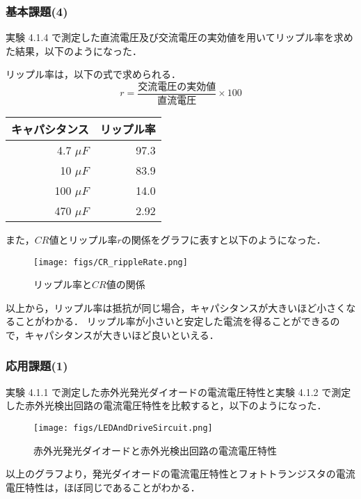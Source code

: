 \documentclass{ltjsarticle}
\begin{document}
\subsubsection{基本課題(4)}
実験 4.1.4 で測定した直流電圧及び交流電圧の実効値を用いてリップル率を求めた結果，以下のようになった．

リップル率は，以下の式で求められる．
\begin{equation}
  r = \frac{{\text{交流電圧の実効値}}}{{\text{直流電圧}}} \times 100
\end{equation}

\begin{table}[H]
  \centering
  \begin{tabular}{|r|r|}
    \hline
    キャパシタンス & リップル率 \\
    \hline
    4.7 ${\mu F}$ & 97.3 \\
    10 ${\mu F}$ & 83.9 \\
    100 ${\mu F}$ & 14.0 \\
    470 ${\mu F}$ & 2.92 \\
    \hline
  \end{tabular}
\end{table}

また，${CR}$値とリップル率${r}$の関係をグラフに表すと以下のようになった．
\begin{figure}[H]
  \centering
  \texttt{[image: figs/CR\_rippleRate.png]}
  \caption{リップル率と${CR}$値の関係}
\end{figure}

以上から，リップル率は抵抗が同じ場合，キャパシタンスが大きいほど小さくなることがわかる．
リップル率が小さいと安定した電流を得ることができるので，キャパシタンスが大きいほど良いといえる．

\subsubsection{応用課題(1)}
実験 4.1.1 で測定した赤外光発光ダイオードの電流電圧特性と実験 4.1.2 で測定した赤外光検出回路の電流電圧特性を比較すると，以下のようになった．
\begin{figure}[H]
  \centering
  \texttt{[image: figs/LEDAndDriveSircuit.png]}
  \caption{赤外光発光ダイオードと赤外光検出回路の電流電圧特性}
\end{figure}

以上のグラフより，発光ダイオードの電流電圧特性とフォトトランジスタの電流電圧特性は，ほぼ同じであることがわかる．
\end{document}
